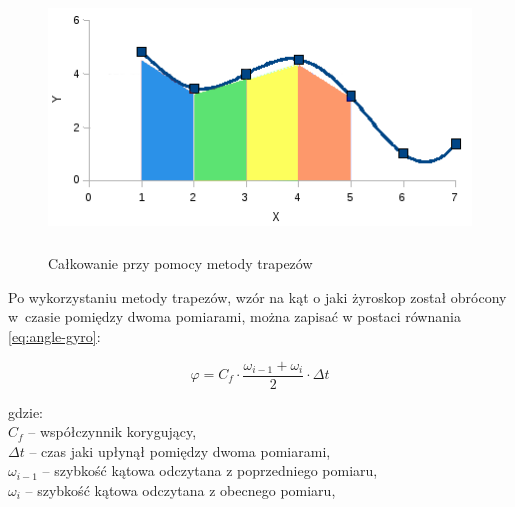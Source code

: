 \begin{figure}[!ht]
 \centering
 \includegraphics[height=70mm]{../images/ch04/calkowanie-metoda-trapezow.png}
 \caption[Całkowanie przy pomocy metody trapezów]{Całkowanie przy pomocy metody trapezów\footnotemark}
 \label{fig:CalkowanieTrapezy}
\end{figure}

Po wykorzystaniu metody trapezów, wzór na kąt o jaki żyroskop został obrócony
w~czasie pomiędzy dwoma pomiarami, można zapisać w postaci równania \ref{eq:angle-gyro}:

\begin{equation}
 \label{eq:angle-gyro}
  \varphi = C_{f} \cdot \frac{\omega_{i-1} + \omega_{i}}{2} \cdot \Delta t
\end{equation}
\begin{tabbing}
  gdzie: \= \\
    \> $C_{f}$ -- współczynnik korygujący, \\
    \> $\Delta t$ -- czas jaki upłynął pomiędzy dwoma pomiarami,\\
    \> $\omega_{i-1}$ -- szybkość kątowa odczytana z poprzedniego pomiaru,\\
    \> $\omega_{i}$ -- szybkość kątowa odczytana z obecnego pomiaru,\\
\end{tabbing}

